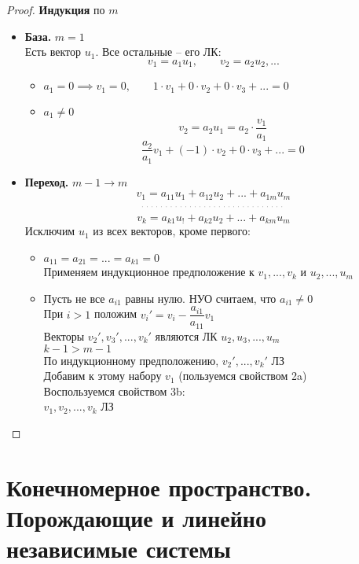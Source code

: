 \begin{proof}
    \textbf{Индукция} по $m$
    \begin{itemize}
        \item \textbf{База.} $m = 1$ \\
        Есть вектор $u_1$. Все остальные -- его ЛК:
        $$ v_1 = a_1u_1, \qquad v_2 = a_2u_2, ... $$
        \begin{itemize}
        	\item $a_1 = 0 \implies v_1 = 0, \qquad 1 \cdot v_1 + 0 \cdot v_2 + 0 \cdot v_3 + ... = 0 $
            \item $a_1 \ne 0 $
            $$ v_2 = a_2u_1 = a_2 \cdot \frac{v_1}{a_1} $$
            $$ \frac{a_2}{a_1} v_1 + (-1) \cdot v_2 + 0 \cdot v_3 + ... = 0 $$
        \end{itemize}
        \item \textbf{Переход.} $ m - 1 \to m $
        $$ v_1 = a_{11}u_1 + a_{12}u_2 + ... + a_{1m}u_m $$
        $$ \widedots $$
        $$ v_k = a_{k1}u_! + a_{k2}u_2 + ... + a_{km}u_m $$
        Исключим $u_1$ из всех векторов, кроме первого:
        \begin{itemize}
            \item $a_{11} = a_{21} = ... = a_{k1} = 0 $ \\
            Применяем индукционное предположение к $v_1, ..., v_k$ и $u_2, ..., u_m$
            \item Пусть не все $a_{i1}$ равны нулю. НУО считаем, что $a_{i1} \ne 0$ \\
            При $i > 1$ положим $v_i' = v_i - \dfrac{a_{i1}}{a_{11}}v_1 $ \\
            Векторы $v_2', v_3', ..., v_k'$ являются ЛК $u_2, u_3, ..., u_m$ \\
            $ k - 1 > m - 1 $ \\
            По индукционному предположению, $v_2', ..., v_k'$ ЛЗ \\
            Добавим к этому набору $v_1$ (пользуемся свойством 2a) \\
            Воспользуемся свойством 3b: \\
            $ v_1, v_2, ..., v_k $ ЛЗ
        \end{itemize}
    \end{itemize}
\end{proof}

\section{Конечномерное пространство. Порождающие и линейно независимые системы}

